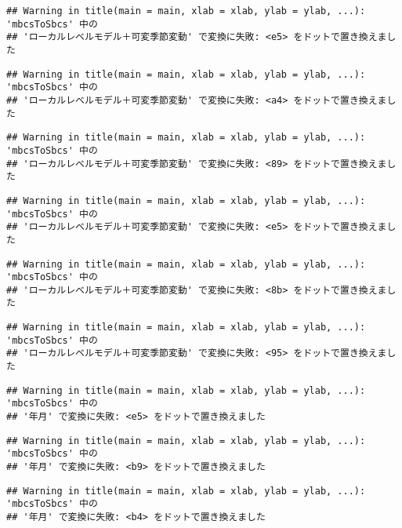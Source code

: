 \documentclass[]{article}
\begin{document}
\begin{verbatim}
## Warning in title(main = main, xlab = xlab, ylab = ylab, ...): 'mbcsToSbcs' 中の
## 'ローカルレベルモデル＋可変季節変動' で変換に失敗: <e5> をドットで置き換えました
\end{verbatim}

\begin{verbatim}
## Warning in title(main = main, xlab = xlab, ylab = ylab, ...): 'mbcsToSbcs' 中の
## 'ローカルレベルモデル＋可変季節変動' で変換に失敗: <a4> をドットで置き換えました
\end{verbatim}

\begin{verbatim}
## Warning in title(main = main, xlab = xlab, ylab = ylab, ...): 'mbcsToSbcs' 中の
## 'ローカルレベルモデル＋可変季節変動' で変換に失敗: <89> をドットで置き換えました
\end{verbatim}

\begin{verbatim}
## Warning in title(main = main, xlab = xlab, ylab = ylab, ...): 'mbcsToSbcs' 中の
## 'ローカルレベルモデル＋可変季節変動' で変換に失敗: <e5> をドットで置き換えました
\end{verbatim}

\begin{verbatim}
## Warning in title(main = main, xlab = xlab, ylab = ylab, ...): 'mbcsToSbcs' 中の
## 'ローカルレベルモデル＋可変季節変動' で変換に失敗: <8b> をドットで置き換えました
\end{verbatim}

\begin{verbatim}
## Warning in title(main = main, xlab = xlab, ylab = ylab, ...): 'mbcsToSbcs' 中の
## 'ローカルレベルモデル＋可変季節変動' で変換に失敗: <95> をドットで置き換えました
\end{verbatim}

\begin{verbatim}
## Warning in title(main = main, xlab = xlab, ylab = ylab, ...): 'mbcsToSbcs' 中の
## '年月' で変換に失敗: <e5> をドットで置き換えました
\end{verbatim}

\begin{verbatim}
## Warning in title(main = main, xlab = xlab, ylab = ylab, ...): 'mbcsToSbcs' 中の
## '年月' で変換に失敗: <b9> をドットで置き換えました
\end{verbatim}

\begin{verbatim}
## Warning in title(main = main, xlab = xlab, ylab = ylab, ...): 'mbcsToSbcs' 中の
## '年月' で変換に失敗: <b4> をドットで置き換えました
\end{verbatim}
\end{document}

